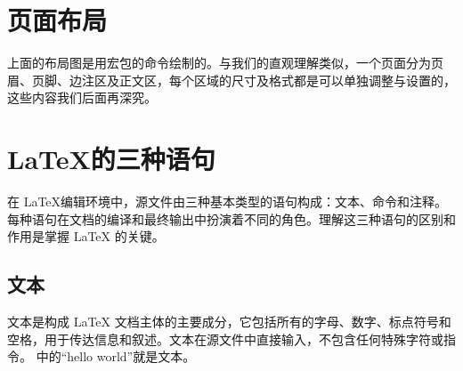 \clearpage

\section{页面布局}
\drawpage
上面的布局图是用宏包的\texinline{\drawpage}命令绘制的。与我们的直观理解类似，一个页面分为页眉、页脚、边注区及正文区，每个区域的尺寸及格式都是可以单独调整与设置的，这些内容我们后面再深究。

\section{\LaTeX 的三种语句} \label{sec:text type}
在 \LaTeX 编辑环境中，源文件由三种基本类型的语句构成：文本、命令和注释。每种语句在文档的编译和最终输出中扮演着不同的角色。理解这三种语句的区别和作用是掌握 LaTeX 的关键。

\subsection{文本}
文本是构成 LaTeX
文档主体的主要成分，它包括所有的字母、数字、标点符号和空格，用于传达信息和叙述。文本在源文件中直接输入，不包含任何特殊字符或指令。
中的\enquote{hello
	world}就是文本。

